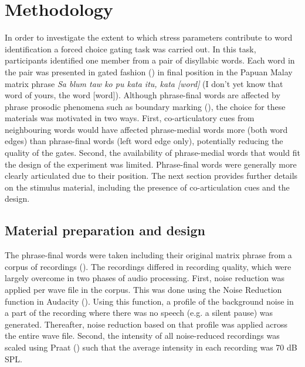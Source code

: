 \section{Methodology} \label{sec53}
In order to investigate the extent to which stress parameters contribute to word identification a forced choice gating task was carried out. In this task, participants identified one member from a pair of disyllabic words. Each word in the pair was presented in gated fashion (\citealt{cotton_gating_1984}) in final position in the Papuan Malay matrix phrase \textit{Sa blum taw ko pu kata itu, kata [word]} (I don’t yet know that word of yours, the word [word]). Although phrase-final words are affected by phrase prosodic phenomena such as boundary marking (\citealt{kaland_demarcating_2020}), the choice for these materials was motivated in two ways. First, co-articulatory cues from neighbouring words would have affected phrase-medial words more (both word edges) than phrase-final words (left word edge only), potentially reducing the quality of the gates. Second, the availability of phrase-medial words that would fit the design of the experiment was limited. Phrase-final words were generally more clearly articulated due to their position. The next section provides further details on the stimulus material, including the presence of co-articulation cues and the design.

\subsection{Material preparation and design} \label{sec531}
The phrase-final words were taken including their original matrix phrase from a corpus of recordings (\citealt{kluge_papuan_2014}). The recordings differed in recording quality, which were largely overcome in two phases of audio processing. First, noise reduction was applied per wave file in the corpus. This was done using the Noise Reduction function in Audacity (\citealt{audacityteam_audacity_2019}). Using this function, a profile of the background noise in a part of the recording where there was no speech (e.g. a silent pause) was generated. Thereafter, noise reduction based on that profile was applied across the entire wave file. Second, the intensity of all noise-reduced recordings was scaled using Praat (\citealt{boersma_praat_2019}) such that the average intensity in each recording was 70 dB SPL.\par

